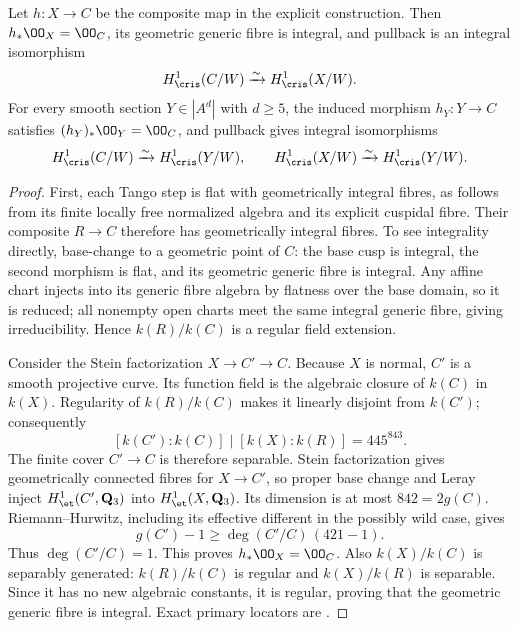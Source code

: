 \begin{lemma}
\label{lem:OC-integral-first-lattice}
Let $h:X\to C$ be the composite map in the explicit construction.  Then $h_*\OO_X=\OO_C$, its geometric generic fibre is integral, and pullback is an integral isomorphism
\[
                 H^1_{\cris}(C/W)\xrightarrow{\sim}H^1_{\cris}(X/W).
\]
For every smooth section $Y\in|A^d|$ with $d\geq5$, the induced morphism $h_Y:Y\to C$ satisfies $(h_Y)_*\OO_Y=\OO_C$, and pullback gives integral isomorphisms
\[
       H^1_{\cris}(C/W)\xrightarrow{\sim}H^1_{\cris}(Y/W),
       \qquad H^1_{\cris}(X/W)\xrightarrow{\sim}H^1_{\cris}(Y/W).
\]
\end{lemma}
\begin{proof}
First, each Tango step is flat with geometrically integral fibres, as follows from its finite locally free normalized algebra and its explicit cuspidal fibre.  Their composite $R\to C$ therefore has geometrically integral fibres.  To see integrality directly, base-change to a geometric point of $C$: the base cusp is integral, the second morphism is flat, and its geometric generic fibre is integral.  Any affine chart injects into its generic fibre algebra by flatness over the base domain, so it is reduced; all nonempty open charts meet the same integral generic fibre, giving irreducibility.  Hence $k(R)/k(C)$ is a regular field extension.

Consider the Stein factorization $X\to C'\to C$.  Because $X$ is normal, $C'$ is a smooth projective curve.  Its function field is the algebraic closure of $k(C)$ in $k(X)$.  Regularity of $k(R)/k(C)$ makes it linearly disjoint from $k(C')$; consequently
\[
                  [k(C'):k(C)]\mid[k(X):k(R)]=445^{843}.
\]
The finite cover $C'\to C$ is therefore separable.  Stein factorization gives geometrically connected fibres for $X\to C'$, so proper base change and Leray inject $H^1_{\et}(C',\mathbf Q_3)$ into $H^1_{\et}(X,\mathbf Q_3)$.  Its dimension is at most $842=2g(C)$.  Riemann--Hurwitz, including its effective different in the possibly wild case, gives
\[
                  g(C')-1\geq\deg(C'/C)\,(421-1).
\]
Thus $\deg(C'/C)=1$.  This proves $h_*\OO_X=\OO_C$.
Also $k(X)/k(C)$ is separably generated: $k(R)/k(C)$ is regular and $k(X)/k(R)$ is separable.  Since it has no new algebraic constants, it is regular, proving that the geometric generic fibre is integral.  Exact primary locators are
\cite[Theorem~37.53.4, Tag~03H0; Lemma~53.12.2, Tag~0C1D, in Section~53.12, Tag~0C1B]{StacksProject}.


\end{proof}
